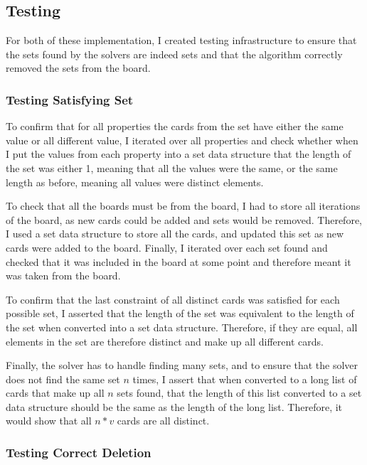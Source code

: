 \documentclass[pageno]{jpaper}
\begin{document}
\subsection{Testing}

For both of these implementation, I created testing infrastructure to ensure that the sets found by the solvers are indeed sets and that the algorithm correctly removed the sets from the board. 

\subsubsection{Testing Satisfying Set}

To confirm that for all properties the cards from the set have either the same value or all different value, I iterated over all properties and check whether when I put the values from each property into a set data structure that the length of the set was either 1, meaning that all the values were the same, or the same length as before, meaning all values were distinct elements. 

To check that all the boards must be from the board, I had to store all iterations of the board, as new cards could be added and sets would be removed. Therefore, I used a set data structure to store all the cards, and updated this set as new cards were added to the board. Finally, I iterated over each set found and checked that it was included in the board at some point and therefore meant it was taken from the board. 

To confirm that the last constraint of all distinct cards was satisfied for each possible set, I asserted that the length of the set was equivalent to the length of the set when converted into a set data structure. Therefore, if they are equal, all elements in the set are therefore distinct and make up all different cards.

Finally, the solver has to handle finding many sets, and to ensure that the solver does not find the same set $n$ times, I assert that when converted to a long list of cards that make up all $n$ sets found, that the length of this list converted to a set data structure should be the same as the length of the long list. Therefore, it would show that all $n*v$ cards are all distinct. 

\subsubsection{Testing Correct Deletion}
\end{document}
